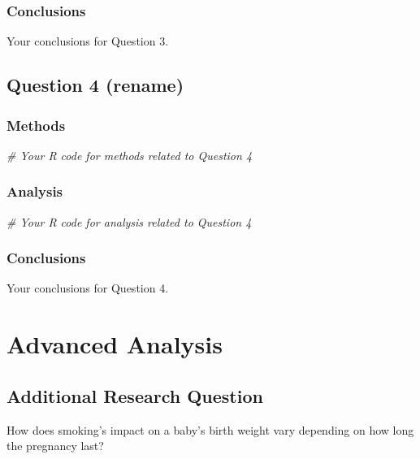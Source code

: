 \documentclass[
]{article}
\newenvironment{Shaded}{\begin{snugshade}}{\end{snugshade}}
\newcommand{\CommentTok}[1]{\textcolor[rgb]{0.56,0.35,0.01}{\textit{#1}}}
\begin{document}
\subsubsection{Conclusions}\label{conclusions-3}

Your conclusions for Question 3.

\subsection{Question 4 (rename)}\label{question-4-rename}

\subsubsection{Methods}\label{methods-4}

\begin{Shaded}
\begin{Highlighting}[]
\CommentTok{\# Your R code for methods related to Question 4}
\end{Highlighting}
\end{Shaded}

\subsubsection{Analysis}\label{analysis-4}

\begin{Shaded}
\begin{Highlighting}[]
\CommentTok{\# Your R code for analysis related to Question 4}
\end{Highlighting}
\end{Shaded}

\subsubsection{Conclusions}\label{conclusions-4}

Your conclusions for Question 4.

\section{Advanced Analysis}\label{advanced-analysis}

\subsection{Additional Research
Question}\label{additional-research-question}

How does smoking's impact on a baby's birth weight vary depending on how
long the pregnancy last?
\end{document}
